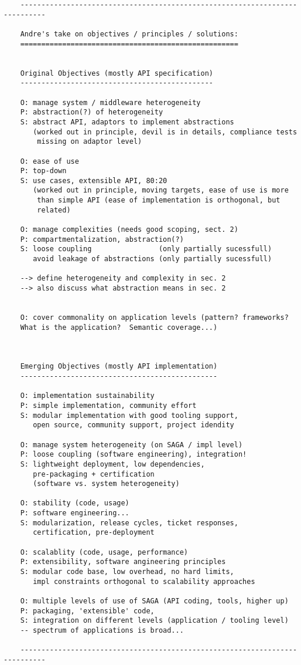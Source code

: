 \documentclass[a4paper,10pt]{article}
\begin{document}
  \begin{verbatim}
    ----------------------------------------------------------------------------

    Andre's take on objectives / principles / solutions:
    ====================================================


    Original Objectives (mostly API specification)
    ----------------------------------------------

    O: manage system / middleware heterogeneity
    P: abstraction(?) of heterogeneity
    S: abstract API, adaptors to implement abstractions
       (worked out in principle, devil is in details, compliance tests
        missing on adaptor level)

    O: ease of use
    P: top-down
    S: use cases, extensible API, 80:20
       (worked out in principle, moving targets, ease of use is more
        than simple API (ease of implementation is orthogonal, but
        related)

    O: manage complexities (needs good scoping, sect. 2)
    P: compartmentalization, abstraction(?)
    S: loose coupling                (only partially sucessfull)
       avoid leakage of abstractions (only partially sucessfull)

    --> define heterogeneity and complexity in sec. 2
    --> also discuss what abstraction means in sec. 2


    O: cover commonality on application levels (pattern? frameworks?
    What is the application?  Semantic coverage...)



    Emerging Objectives (mostly API implementation)
    -----------------------------------------------

    O: implementation sustainability
    P: simple implementation, community effort
    S: modular implementation with good tooling support,
       open source, community support, project idendity

    O: manage system heterogeneity (on SAGA / impl level)
    P: loose coupling (software engineering), integration!
    S: lightweight deployment, low dependencies, 
       pre-packaging + certification
       (software vs. system heterogeneity)

    O: stability (code, usage)
    P: software engineering...
    S: modularization, release cycles, ticket responses,
       certification, pre-deployment

    O: scalablity (code, usage, performance)
    P: extensibility, software angineering principles
    S: modular code base, low overhead, no hard limits,
       impl constraints orthogonal to scalability approaches

    O: multiple levels of use of SAGA (API coding, tools, higher up)
    P: packaging, 'extensible' code, 
    S: integration on different levels (application / tooling level)
    -- spectrum of applications is broad...
    
    ----------------------------------------------------------------------------
  \end{verbatim}
\end{document}
